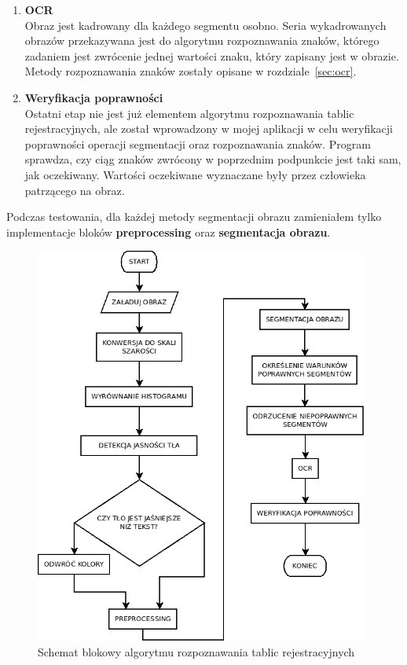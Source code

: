 \begin{enumerate}
    \item \textbf{OCR}\\
      Obraz jest kadrowany dla każdego segmentu osobno. Seria wykadrowanych obrazów przekazywana jest do algorytmu rozpoznawania znaków, którego zadaniem jest zwrócenie jednej wartości znaku, który zapisany jest w obrazie. Metody rozpoznawania znaków zostały opisane w rozdziale~\ref{sec:ocr}.
    \item \textbf{Weryfikacja poprawności}\\
      Ostatni etap nie jest już elementem algorytmu rozpoznawania tablic rejestracyjnych, ale został wprowadzony w mojej aplikacji w celu weryfikacji poprawności operacji segmentacji oraz rozpoznawania znaków. Program sprawdza, czy ciąg znaków zwrócony w poprzednim podpunkcie jest taki sam, jak oczekiwany. Wartości oczekiwane wyznaczane były przez człowieka patrzącego na obraz.
\end{enumerate}
Podczas testowania, dla każdej metody segmentacji obrazu zamieniałem tylko implementacje bloków \textbf{preprocessing} oraz \textbf{segmentacja obrazu}.
\begin{figure}
  \centering
  \includegraphics[width=0.98\textwidth]{img/main-flowchart}
  \caption{Schemat blokowy algorytmu rozpoznawania tablic rejestracyjnych}
  \label{fig:main_flowchart}
\end{figure}

